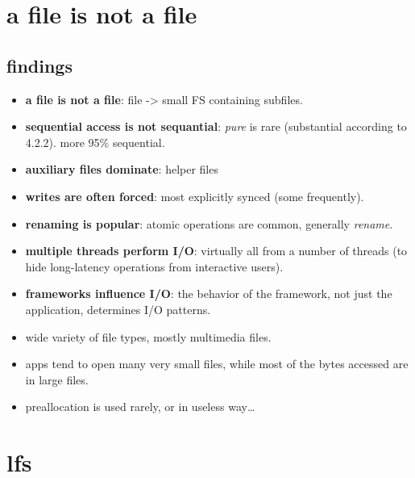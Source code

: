 \documentclass[9pt,conference]{IEEEtran}
\begin{document}
\section{a file is not a file}
\label{sec-5}
\subsection{findings}
\label{sec-5-1}
\begin{itemize}
\item \textbf{a file is not a file}: file -> small FS containing subfiles.
\item \textbf{sequential access is not sequantial}: \emph{pure} is rare (substantial according to 4.2.2). more 95\% sequential.
\item \textbf{auxiliary files dominate}: helper files
\item \textbf{writes are often forced}: most explicitly synced (some frequently).
\item \textbf{renaming is popular}: atomic operations are common, generally \emph{rename}.
\item \textbf{multiple threads perform I/O}: virtually all from a number of threads (to hide long-latency operations from interactive users).
\item \textbf{frameworks influence I/O}: the behavior of the framework, not just the application, determines I/O patterns.
\item wide variety of file types, mostly multimedia files.
\item apps tend to open many very small files, while most of the bytes accessed are in large files.
\item preallocation is used rarely, or in useless way\ldots{}
\end{itemize}

\section{lfs}
\label{sec-6}
\end{document}
